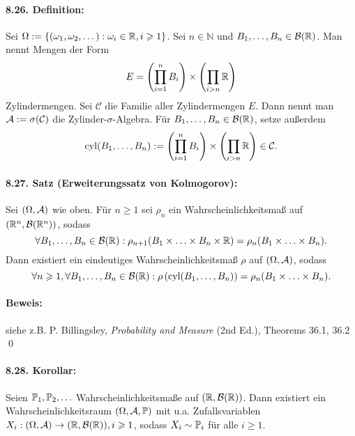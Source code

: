 \paragraph{8.26. Definition:}Sei $\Omega:=\{(\omega_1,\omega_2,\dots):\omega_i\in\mathbb{R},i\geqslant1\}$. Sei $n\in\mathbb{N}$ und $B_1,\dots,B_n\in\mathcal{B}(\mathbb{R})$. Man nennt Mengen der Form
$$E=\left(\prod_{i=1}^nB_i\right)\times\left(\prod_{i>n}\mathbb{R}\right)$$
Zylindermengen. Sei $\mathcal{C}$ die Familie aller Zylindermengen $E$. Dann nennt man $\mathcal{A}:=\sigma(\mathcal{C})$ die Zylinder-$\sigma$-Algebra. F\"ur $B_1,\hdots,B_n\in\mathcal{B}(\mathbb{R})$, setze au\ss{}erdem 
$$\operatorname{cyl}(B_1,\dots,B_n):=\left(\prod_{i=1}^nB_i\right)\times\left(\prod_{i>n}\mathbb{R}\right)\in\mathcal{C}.$$

\paragraph{8.27. Satz (Erweiterungssatz von Kolmogorov):} Sei $(\Omega,\mathcal{A})$ wie oben. F\"ur $n\geq1$ sei $\rho_n$ ein Wahrscheinlichkeitsma\ss{} auf $(\mathbb{R}^n,\mathcal{B}(\mathbb{R}^n))$, sodass
$$\forall B_1,\hdots,B_n\in\mathcal{B}(\mathbb{R}):\rho_{n+1}(B_1\times\hdots\times B_n\times\mathbb{R})=\rho_n(B_1\times\hdots\times B_n).$$
Dann existiert ein eindeutiges Wahrscheinlichkeitsma\ss{} $\rho$ auf $(\Omega,\mathcal{A})$, sodass
$$\forall n\geqslant1,\forall B_1,\hdots,B_n\in\mathcal{B}(\mathbb{R}):\rho\left(\operatorname{cyl}(B_1,\hdots, B_n)\right)=\rho_n(B_1\times\hdots\times B_n).$$

\paragraph{Beweis:}siehe z.B. P. Billingsley, \textit{Probability and Measure} (2nd Ed.), Theorems 36.1, 36.2 \qed


\paragraph{8.28. Korollar:}
Seien $\mathbb{P}_1,\mathbb{P}_2,\hdots$ Wahrscheinlichkeitsma\ss{}e auf $(\mathbb{R},\mathcal{B}(\mathbb{R}))$. Dann existiert ein Wahrscheinlichkeitsraum $(\Omega, \mathcal{A}, \mathbb{P})$ mit u.a. Zufallsvariablen $X_i:(\Omega,\mathcal{A})\to(\mathbb{R},\mathcal{B}(\mathbb{R})),i\geqslant1$, sodass $X_i\sim \mathbb{P}_i$ f\"ur alle $i\geq1$.
